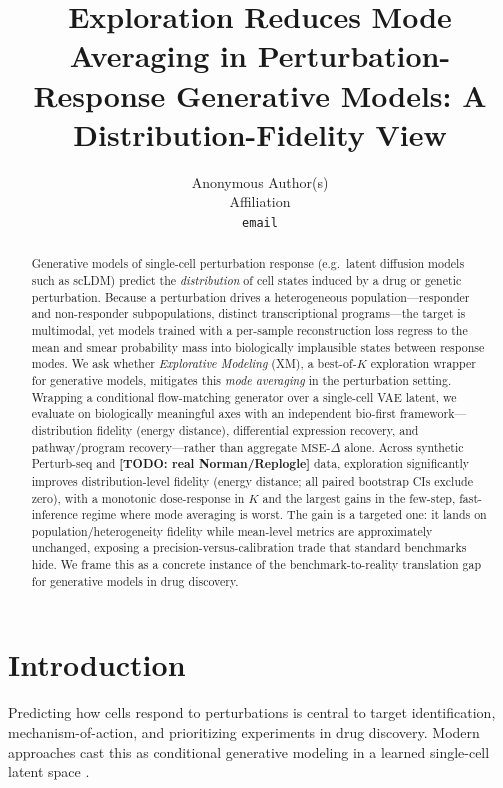 \documentclass{article}
\title{Exploration Reduces Mode Averaging in Perturbation-Response
Generative Models: A Distribution-Fidelity View}
\author{%
  Anonymous Author(s) \\
  Affiliation \\
  \texttt{email} \\
}
\newcommand{\TODO}[1]{{\color{red}\textbf{[TODO: #1]}}}
\begin{document}
\maketitle

\begin{abstract}
Generative models of single-cell perturbation response (e.g.\ latent diffusion
models such as scLDM) predict the \emph{distribution} of cell states induced by
a drug or genetic perturbation. Because a perturbation drives a heterogeneous
population---responder and non-responder subpopulations, distinct
transcriptional programs---the target is multimodal, yet models trained with a
per-sample reconstruction loss regress to the mean and smear probability mass
into biologically implausible states between response modes. We ask whether
\emph{Explorative Modeling} (XM), a best-of-$K$ exploration wrapper for
generative models, mitigates this \emph{mode averaging} in the perturbation
setting. Wrapping a conditional flow-matching generator over a single-cell VAE
latent, we evaluate on biologically meaningful axes with an independent
bio-first framework---distribution fidelity (energy distance), differential
expression recovery, and pathway/program recovery---rather than aggregate
$\text{MSE-}\Delta$ alone. Across synthetic Perturb-seq and \TODO{real
Norman/Replogle} data, exploration significantly improves distribution-level
fidelity (energy distance; all paired bootstrap CIs exclude zero), with a
monotonic dose-response in $K$ and the largest gains in the few-step,
fast-inference regime where mode averaging is worst. The gain is a targeted one:
it lands on population/heterogeneity fidelity while mean-level metrics are
approximately unchanged, exposing a precision-versus-calibration trade that
standard benchmarks hide. We frame this as a concrete instance of the
benchmark-to-reality translation gap for generative models in drug discovery.
\end{abstract}

\section{Introduction}
\label{sec:intro}
Predicting how cells respond to perturbations is central to target
identification, mechanism-of-action, and prioritizing experiments in drug
discovery. Modern approaches cast this as conditional generative modeling in a
learned single-cell latent space \citep{scldm,scvi}.
\end{document}

